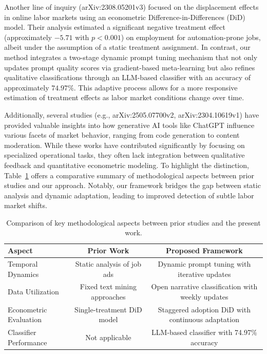 \documentclass{article}
\begin{document}
Another line of inquiry (arXiv:2308.05201v3) focused on the displacement effects in online labor markets using an econometric Difference-in-Differences (DiD) model. Their analysis estimated a significant negative treatment effect (approximately \(-5.71\) with \(p < 0.001\)) on employment for automation-prone jobs, albeit under the assumption of a static treatment assignment. In contrast, our method integrates a two-stage dynamic prompt tuning mechanism that not only updates prompt quality scores via gradient-based meta-learning but also refines qualitative classifications through an LLM-based classifier with an accuracy of approximately \(74.97\%\). This adaptive process allows for a more responsive estimation of treatment effects as labor market conditions change over time.

Additionally, several studies (e.g., arXiv:2505.07700v2, arXiv:2304.10619v1) have provided valuable insights into how generative AI tools like ChatGPT influence various facets of market behavior, ranging from code generation to content moderation. While these works have contributed significantly by focusing on specialized operational tasks, they often lack integration between qualitative feedback and quantitative econometric modeling. To highlight the distinction, Table~\ref{tab:compare} offers a comparative summary of methodological aspects between prior studies and our approach. Notably, our framework bridges the gap between static analysis and dynamic adaptation, leading to improved detection of subtle labor market shifts.

\begin{table}[h]
\centering
\begin{tabular}{lcc}
\hline
\textbf{Aspect} & \textbf{Prior Work} & \textbf{Proposed Framework} \\
\hline
Temporal Dynamics & Static analysis of job ads & Dynamic prompt tuning with iterative updates \\
Data Utilization & Fixed text mining approaches & Open narrative classification with weekly updates \\
Econometric Evaluation & Single-treatment DiD model & Staggered adoption DiD with continuous adaptation \\
Classifier Performance & Not applicable & LLM-based classifier with 74.97\% accuracy \\
\hline
\end{tabular}
\caption{Comparison of key methodological aspects between prior studies and the present work.}
\label{tab:compare}
\end{table}
\end{document}
